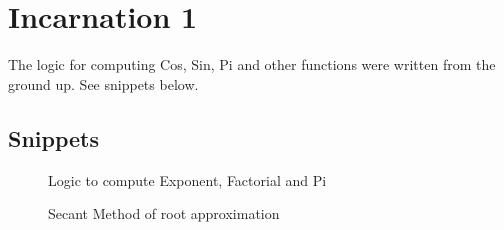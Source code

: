 \section{Incarnation 1}
  \begin{flushleft}
    The logic for computing Cos, Sin, Pi and other functions were written from the ground up. See snippets below.
  \end{flushleft}
  \subsection{Snippets}
  \vspace{2em}
    \begin{figure}[h!]
      \centering
      \caption{Logic to compute Exponent, Factorial and Pi}
      \label{fig:Math Library}
    \end{figure}
    \pagebreak
    \begin{figure}[h!]
      \centering
      \caption{Secant Method of root approximation}
      \label{fig:Root Approximation}
    \end{figure}

